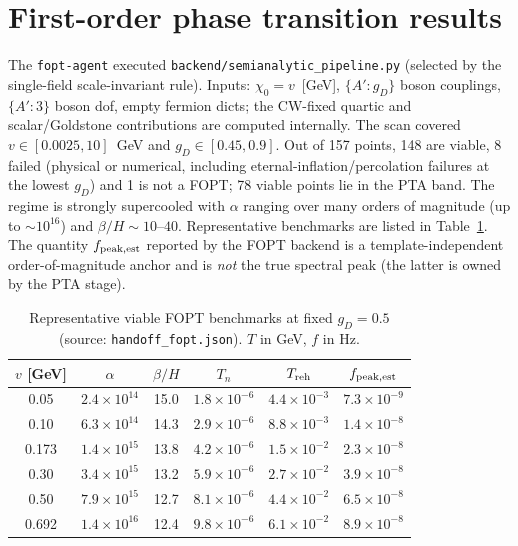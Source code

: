 \documentclass[11pt]{article}
\newcommand{\gD}{g_D}
\newcommand{\betaH}{\beta/H}
\begin{document}
\section{First-order phase transition results}
\label{sec:fopt}
The \texttt{fopt-agent} executed \texttt{backend/semianalytic\_pipeline.py}
(selected by the single-field scale-invariant rule). Inputs:
$\chi_0=v$~[GeV], $\{A':\gD\}$ boson couplings, $\{A':3\}$ boson dof, empty
fermion dicts; the CW-fixed quartic and scalar/Goldstone contributions are
computed internally. The scan covered $v\in[0.0025,10]$~GeV and
$\gD\in[0.45,0.9]$. Out of 157 points, 148 are viable, 8 failed (physical or
numerical, including eternal-inflation/percolation failures at the lowest
$\gD$) and 1 is not a FOPT; 78 viable points lie in the PTA band. The regime is
strongly supercooled with $\alpha$ ranging over many orders of magnitude (up to
$\sim10^{16}$) and $\betaH\sim10$--$40$. Representative benchmarks are listed in
Table~\ref{tab:fopt}. The quantity $f_{\rm peak,est}$ reported by the FOPT
backend is a template-independent order-of-magnitude anchor and is \emph{not}
the true spectral peak (the latter is owned by the PTA stage).

\begin{table}[ht]
\centering\small
\caption{Representative viable FOPT benchmarks at fixed $\gD=0.5$ (source:
\texttt{handoff\_fopt.json}). $T$ in GeV, $f$ in Hz.}
\label{tab:fopt}
\begin{tabular}{c c c c c c}
\toprule
$v$ [GeV] & $\alpha$ & $\betaH$ & $T_n$ & $T_{\rm reh}$ & $f_{\rm peak,est}$ \\
\midrule
0.05 & $2.4\times10^{14}$ & 15.0 & $1.8\times10^{-6}$ & $4.4\times10^{-3}$ & $7.3\times10^{-9}$ \\
0.10 & $6.3\times10^{14}$ & 14.3 & $2.9\times10^{-6}$ & $8.8\times10^{-3}$ & $1.4\times10^{-8}$ \\
0.173 & $1.4\times10^{15}$ & 13.8 & $4.2\times10^{-6}$ & $1.5\times10^{-2}$ & $2.3\times10^{-8}$ \\
0.30 & $3.4\times10^{15}$ & 13.2 & $5.9\times10^{-6}$ & $2.7\times10^{-2}$ & $3.9\times10^{-8}$ \\
0.50 & $7.9\times10^{15}$ & 12.7 & $8.1\times10^{-6}$ & $4.4\times10^{-2}$ & $6.5\times10^{-8}$ \\
0.692 & $1.4\times10^{16}$ & 12.4 & $9.8\times10^{-6}$ & $6.1\times10^{-2}$ & $8.9\times10^{-8}$ \\
\bottomrule
\end{tabular}
\end{table}
\end{document}

